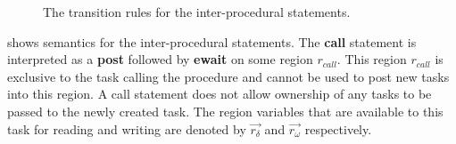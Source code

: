 \begin{figure}
\begin{center}
  \end{center}
  \caption{The transition rules for the inter-procedural statements.}
  \label{fig:inter}
    \label{fig:semantics}
\end{figure}

 shows semantics for the inter-procedural statements. The \textbf{call} statement is interpreted as a \textbf{post} followed by \textbf{ewait} on some region $r_{call}$. This region $r_{call}$ is exclusive to the task calling the procedure and cannot be used to post new tasks into this region. A call statement does not allow ownership of any tasks to be passed to the newly created task. The region variables that are available to this task for reading and writing are denoted by $\vec{r_\delta}$ and $\vec{r_\omega}$ respectively.

